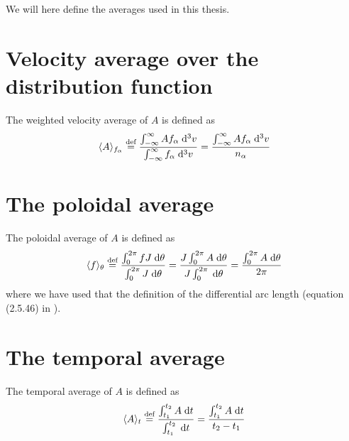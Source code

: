 %
We will here define the averages used in this thesis.
%
\section{Velocity average over the distribution function}
%
The weighted velocity average of $A$ is defined as
%
\begin{align}
    \langle{A}\rangle_{f_\alpha} \overset{\text{def}}{=}
        \frac{
            \int_{-\infty}^{\infty} {Af_\alpha} \; \text{d} {^3v}
        }{
            \int_{-\infty}^{\infty} {f_\alpha} \; \text{d} {^3v}
        }
    =
        \frac{\int_{-\infty}^{\infty} {Af_\alpha} \; \text{d} {^3v}}{n_\alpha}
    \label{app:distAvg}
\end{align}


\section{The poloidal average}
\label{sec:polAvg}
%
The poloidal average of $A$ is defined as
%
\begin{align*}
    \langle{f}\rangle_\theta \overset{\text{def}}{=}
        \frac{
            \int_{0}^{2\pi} {fJ} \; \text{d} {\theta}
        }{
            \int_{0}^{2\pi} {J} \; \text{d} {\theta}
        }
    =
        \frac{
            J\int_{0}^{2\pi} {A} \; \text{d} {\theta}
        }{
            J\int_{0}^{2\pi} {} \; \text{d} {\theta}
        }
    =
        \frac{\int_{0}^{2\pi} {A} \; \text{d} {\theta}}{2\pi}
\end{align*}
%
where we have used that the definition of the differential arc length (equation (2.5.46) in \cite{Dhaeseleer1991book}).

\section{The temporal average}
%
The temporal average of $A$ is defined as
%
\begin{align*}
    \langle{A}\rangle_t \overset{\text{def}}{=}
        \frac{
            \int_{t_1}^{t_2} {A} \; \text{d} {t}
        }{
            \int_{t_1}^{t_2} {} \; \text{d} {t}
        }
    =
        \frac{\int_{t_1}^{t_2} {A} \; \text{d} {t}}{t_2-t_1}
\end{align*}
